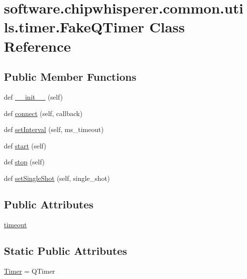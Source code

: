 \hypertarget{classsoftware_1_1chipwhisperer_1_1common_1_1utils_1_1timer_1_1FakeQTimer}{}\section{software.\+chipwhisperer.\+common.\+utils.\+timer.\+Fake\+Q\+Timer Class Reference}
\label{classsoftware_1_1chipwhisperer_1_1common_1_1utils_1_1timer_1_1FakeQTimer}
\subsection*{Public Member Functions}
\begin{DoxyCompactItemize}
\item 
def \hyperlink{classsoftware_1_1chipwhisperer_1_1common_1_1utils_1_1timer_1_1FakeQTimer_ac028360f72084ef25a0c97d2edebac97}{\+\_\+\+\_\+init\+\_\+\+\_\+} (self)
\item 
def \hyperlink{classsoftware_1_1chipwhisperer_1_1common_1_1utils_1_1timer_1_1FakeQTimer_abf376752153c5974f821c4be4c3e164e}{connect} (self, callback)
\item 
def \hyperlink{classsoftware_1_1chipwhisperer_1_1common_1_1utils_1_1timer_1_1FakeQTimer_a40cf110c2d7815c6efae66b896d74868}{set\+Interval} (self, ms\+\_\+timeout)
\item 
def \hyperlink{classsoftware_1_1chipwhisperer_1_1common_1_1utils_1_1timer_1_1FakeQTimer_a52db52d71b88f18a465e2acbda588e9f}{start} (self)
\item 
def \hyperlink{classsoftware_1_1chipwhisperer_1_1common_1_1utils_1_1timer_1_1FakeQTimer_a8136527866560186a65442f98c63d1ee}{stop} (self)
\item 
def \hyperlink{classsoftware_1_1chipwhisperer_1_1common_1_1utils_1_1timer_1_1FakeQTimer_a7e1ce2f56019dbafbb4900acc51cb62f}{set\+Single\+Shot} (self, single\+\_\+shot)
\end{DoxyCompactItemize}
\subsection*{Public Attributes}
\begin{DoxyCompactItemize}
\item 
\hyperlink{classsoftware_1_1chipwhisperer_1_1common_1_1utils_1_1timer_1_1FakeQTimer_a9e24301cced0ef27c4721e652ee0221e}{timeout}
\end{DoxyCompactItemize}
\subsection*{Static Public Attributes}
\begin{DoxyCompactItemize}
\item 
\hyperlink{classsoftware_1_1chipwhisperer_1_1common_1_1utils_1_1timer_1_1FakeQTimer_a0c7b1e53a861fc83868588c20007fe27}{Timer} = Q\+Timer
\end{DoxyCompactItemize}


